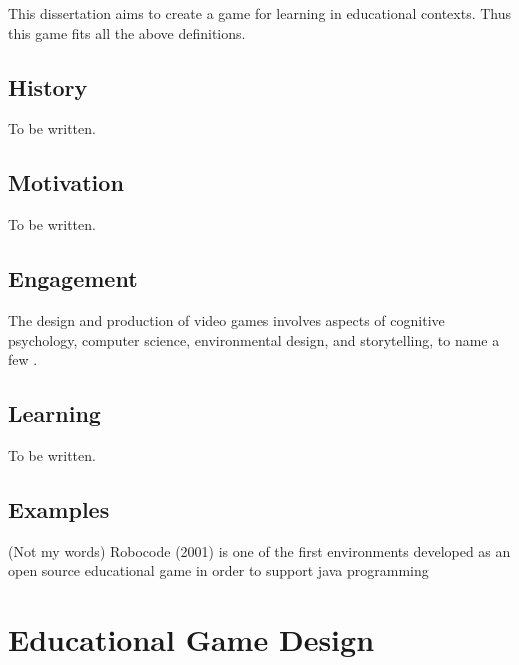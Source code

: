 \documentclass[a4paper,11.5pt]{report}
\numberwithin{figure}{section}
\numberwithin{table}{section}
\numberwithin{equation}{section}
\numberwithin{equation}{section}
\begin{document}

This dissertation aims to create a game for learning in educational contexts. Thus this game fits all the above definitions.

\subsection{History}

To be written.


\subsection{Motivation}

To be written.

\subsection{Engagement}

The design and production of video games involves aspects of cognitive psychology, computer science, environmental design, and storytelling, to name a few \cite{Koster2004}.

\subsection{Learning}

To be written.

\subsection{Examples}

(Not my words) Robocode (2001) is one of the first environments developed as an open source educational game in order to support java programming

\section{Educational Game Design}
\end{document}
